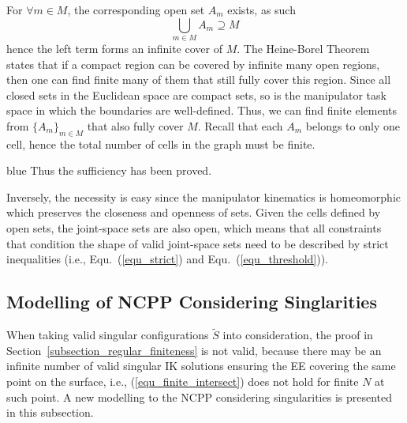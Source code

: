 \documentclass[Afour,sageh,times]{sagej}
\begin{document}
For $\forall m\in M$, the corresponding open set $A_m$ exists, as such 
\begin{equation}
\bigcup\limits_{m\in M}A_m\supseteq M
\end{equation}
hence the left term forms an infinite cover of $M$. 
The Heine-Borel Theorem~\cite{Simmons1964Introduction} states that if a compact region can be covered by infinite many open regions, then one can find finite many of them that still fully cover this region. Since all closed sets in the Euclidean space are compact sets, so is the manipulator 
task space in which the boundaries are well-defined. Thus, we can find finite elements from $\{A_m\}_{m\in M}$ that also fully 
cover $M$. Recall that each $A_m$ belongs to only one cell, hence the total number of cells in the graph must be finite. 
\begin{color}{blue}
Thus the sufficiency has been proved.

Inversely, the necessity is easy since the manipulator kinematics is homeomorphic which preserves the closeness and openness of sets. 
Given the cells defined by open sets, the joint-space sets are also open, which means that all constraints that condition the shape of valid joint-space sets need to be described by strict inequalities (i.e., Equ.~(\ref{equ_strict}) and Equ.~(\ref{equ_threshold})).  


\subsection{Modelling of NCPP Considering Singlarities}
\label{subsection_all_finiteness}
When taking valid singular configurations $\tilde{S}$ into consideration, the proof in Section~\ref{subsection_regular_finiteness} is not valid, because there may be an infinite number of valid singular IK solutions ensuring the EE covering the same point on the surface, i.e., (\ref{equ_finite_intersect}) does not hold for finite $N$ at such point. A new modelling to the NCPP considering singularities is presented in this subsection. 


\end{color}
\end{document}
